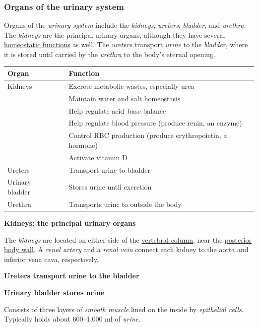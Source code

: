 \documentclass[11pt]{article}
\begin{document}
\subsubsection{Organs of the urinary system}
\label{sec:org177181f}
Organs of the \emph{urinary system} include the \emph{kidneys}, \emph{ureters}, \emph{bladder}, and \emph{urethra}.
The \emph{kidneys} are the principal urinary organs, although they have several
\uline{homeostatic functions} as well. The \emph{ureters} transport \emph{urine} to the \emph{bladder}, where
it is stored until carried by the \emph{urethra} to the body's eternal opening.

\begin{center}
\begin{tabular}{l|ll}
Organ &  & Function\\
\hline
Kidneys &  & Excrete metabolic wastes, especially urea\\
 &  & Maintain water and salt homeostasis\\
 &  & Help regulate acid--base balance\\
 &  & Help regulate blood pressure (produce renin, an enzyme)\\
 &  & Control RBC production (produce erythropoietin, a hormone)\\
 &  & Activate vitamin D\\
\hline
Ureters &  & Transport urine to bladder\\
\hline
Urinary bladder &  & Stores urine until excretion\\
\hline
Urethra &  & Transports urine to outside the body\\
\end{tabular}
\end{center}

\textbf{Kidneys: the principal urinary organs}

The \emph{kidneys} are located on either side of the \uline{vertebral column}, near the
\uline{posterior body wall}. A \emph{renal artery} and a \emph{renal vein} connect each kidney to the
aorta and inferior vena cava, respectively.

\textbf{Ureters transport urine to the bladder}

\textbf{Urinary bladder stores urine}

Consists of three layers of \emph{smooth muscle} lined on the inside by \emph{epithelial
cells}. Typically holds about 600--1,000 ml of \emph{urine}.
\end{document}
